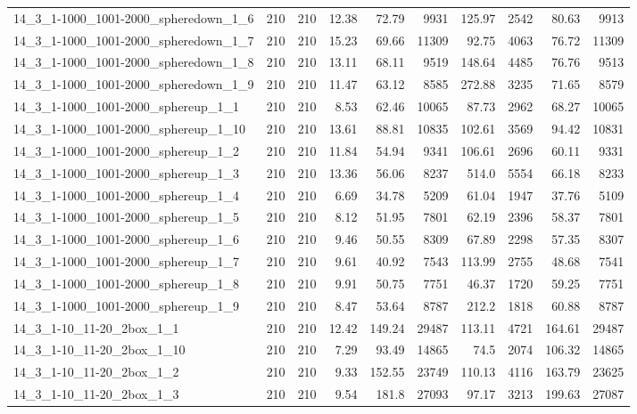 \begin{center}
\begin{scriptsize}
\begin{longtable}{lrrrrrrrrr}
14\_3\_1-1000\_1001-2000\_spheredown\_1\_6 & 210 & 210 & 12.38 & 72.79 & 9931 & 125.97 & 2542 & 80.63 & 9913\\
14\_3\_1-1000\_1001-2000\_spheredown\_1\_7 & 210 & 210 & 15.23 & 69.66 & 11309 & 92.75 & 4063 & 76.72 & 11309\\
14\_3\_1-1000\_1001-2000\_spheredown\_1\_8 & 210 & 210 & 13.11 & 68.11 & 9519 & 148.64 & 4485 & 76.76 & 9513\\
14\_3\_1-1000\_1001-2000\_spheredown\_1\_9 & 210 & 210 & 11.47 & 63.12 & 8585 & 272.88 & 3235 & 71.65 & 8579\\
14\_3\_1-1000\_1001-2000\_sphereup\_1\_1 & 210 & 210 & 8.53 & 62.46 & 10065 & 87.73 & 2962 & 68.27 & 10065\\
14\_3\_1-1000\_1001-2000\_sphereup\_1\_10 & 210 & 210 & 13.61 & 88.81 & 10835 & 102.61 & 3569 & 94.42 & 10831\\
14\_3\_1-1000\_1001-2000\_sphereup\_1\_2 & 210 & 210 & 11.84 & 54.94 & 9341 & 106.61 & 2696 & 60.11 & 9331\\
14\_3\_1-1000\_1001-2000\_sphereup\_1\_3 & 210 & 210 & 13.36 & 56.06 & 8237 & 514.0 & 5554 & 66.18 & 8233\\
14\_3\_1-1000\_1001-2000\_sphereup\_1\_4 & 210 & 210 & 6.69 & 34.78 & 5209 & 61.04 & 1947 & 37.76 & 5109\\
14\_3\_1-1000\_1001-2000\_sphereup\_1\_5 & 210 & 210 & 8.12 & 51.95 & 7801 & 62.19 & 2396 & 58.37 & 7801\\
14\_3\_1-1000\_1001-2000\_sphereup\_1\_6 & 210 & 210 & 9.46 & 50.55 & 8309 & 67.89 & 2298 & 57.35 & 8307\\
14\_3\_1-1000\_1001-2000\_sphereup\_1\_7 & 210 & 210 & 9.61 & 40.92 & 7543 & 113.99 & 2755 & 48.68 & 7541\\
14\_3\_1-1000\_1001-2000\_sphereup\_1\_8 & 210 & 210 & 9.91 & 50.75 & 7751 & 46.37 & 1720 & 59.25 & 7751\\
14\_3\_1-1000\_1001-2000\_sphereup\_1\_9 & 210 & 210 & 8.47 & 53.64 & 8787 & 212.2 & 1818 & 60.88 & 8787\\
14\_3\_1-10\_11-20\_2box\_1\_1 & 210 & 210 & 12.42 & 149.24 & 29487 & 113.11 & 4721 & 164.61 & 29487\\
14\_3\_1-10\_11-20\_2box\_1\_10 & 210 & 210 & 7.29 & 93.49 & 14865 & 74.5 & 2074 & 106.32 & 14865\\
14\_3\_1-10\_11-20\_2box\_1\_2 & 210 & 210 & 9.33 & 152.55 & 23749 & 110.13 & 4116 & 163.79 & 23625\\
14\_3\_1-10\_11-20\_2box\_1\_3 & 210 & 210 & 9.54 & 181.8 & 27093 & 97.17 & 3213 & 199.63 & 27087\\

\end{longtable}
\end{scriptsize}
\end{center}
